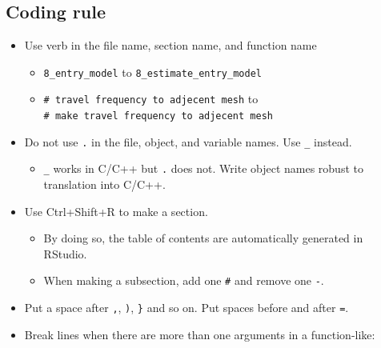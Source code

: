 \documentclass[
]{book}
\providecommand{\tightlist}{%
  \setlength{\itemsep}{0pt}\setlength{\parskip}{0pt}}
\begin{document}
\hypertarget{coding-rule}{%
\subsection{Coding rule}\label{coding-rule}}

\begin{itemize}
\tightlist
\item
  Use verb in the file name, section name, and function name

  \begin{itemize}
  \tightlist
  \item
    \texttt{8\_entry\_model} to \texttt{8\_estimate\_entry\_model}
  \item
    \texttt{\#\ travel\ frequency\ to\ adjecent\ mesh} to \texttt{\#\ make\ travel\ frequency\ to\ adjecent\ mesh}
  \end{itemize}
\item
  Do not use \texttt{.} in the file, object, and variable names. Use \texttt{\_} instead.

  \begin{itemize}
  \tightlist
  \item
    \texttt{\_} works in C/C++ but \texttt{.} does not. Write object names robust to translation into C/C++.
  \end{itemize}
\item
  Use Ctrl+Shift+R to make a section.

  \begin{itemize}
  \tightlist
  \item
    By doing so, the table of contents are automatically generated in RStudio.
  \item
    When making a subsection, add one \texttt{\#} and remove one \texttt{-}.
  \end{itemize}
\item
  Put a space after \texttt{,}, \texttt{)}, \texttt{\}} and so on. Put spaces before and after \texttt{=}.
\item
  Break lines when there are more than one arguments in a function-like:
\end{itemize}
\end{document}
